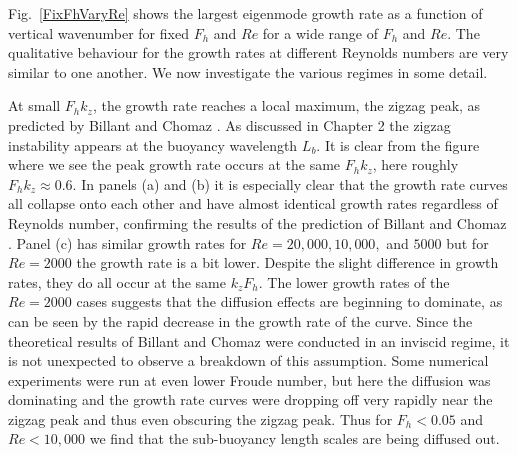 Fig.~\ref{FixFhVaryRe} shows the largest eigenmode growth rate as a function of vertical wavenumber for fixed $F_{h}$ and $Re$ for a wide range of $F_{h}$ and $Re$. The qualitative behaviour for the growth rates at different Reynolds numbers are very similar to one another. We now investigate the various regimes in some detail.

At small $F_{h}k_{z}$, the growth rate reaches a local maximum, the zigzag peak, as predicted by Billant and Chomaz \cite{bc2000a,bc2000b,bc2000c}.  As discussed in Chapter 2 the zigzag instability appears at the buoyancy wavelength $L_{b}$. It is clear from the figure where we see the peak growth rate occurs at the same $F_{h}k_{z}$, here roughly $F_{h}k_{z}\approx 0.6$. In panels (a) and (b) it is especially clear that the growth rate curves all collapse onto each other and have almost identical growth rates regardless of Reynolds number, confirming the results of the prediction of Billant and Chomaz \cite{bc2000b,bc2000c}. Panel (c) has similar growth rates for $Re=20{,}000,10{,}000,$ and $5000$ but for $Re=2000$ the growth rate is a bit lower. Despite the slight difference in growth rates, they do all occur at the same $k_{z}F_{h}$. The lower growth rates of the $Re=2000$ cases suggests that the diffusion effects are beginning to dominate, as can be seen by the rapid decrease in the growth rate of the curve. Since the theoretical results of Billant and Chomaz \cite{bc2000b} were conducted in an inviscid regime, it is not unexpected to observe a breakdown of this assumption. Some numerical experiments were run at even lower Froude number, but here the diffusion was dominating and the growth rate curves were dropping off very rapidly near the zigzag peak and thus even obscuring the zigzag peak. Thus for $F_{h}<0.05$ and $Re<10{,}000$ we find that the sub-buoyancy length scales are being diffused out. 


